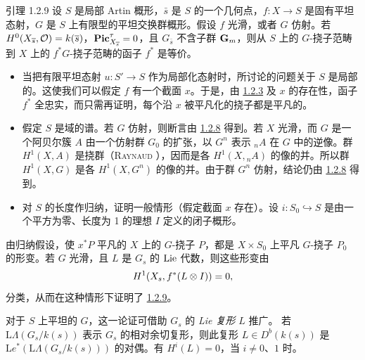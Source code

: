 \begin{enonce*}{引理 1.2.9}
设 $S$ 是局部 Artin 概形，$\bar{s}$ 是 $S$ 的一个几何点，$f:X\rightarrow S$ 是固有平坦态射，$G$ 是 $S$ 上有限型的平坦交换群概形。假设 $f$ 光滑，或者 $G$ 仿射。若 $H^0(X_{\overline{s}},{\mathcal O})=k(\overline{s})$，$\operatorname{\mathbf{Pic}}^{\tau}_{X_{\overline{s}}}=0$，且 $G_{\bar{s}}$ 不含子群 $\mathbf{G}_{m}$，则从 $S$ 上的 $G$-挠子范畴到 $X$ 上的 $f^{\ast}G$-挠子范畴的函子 $f^{\ast}$ 是等价。
\end{enonce*}

\begin{itemize}
\item[a.] 当把有限平坦态射 $u:S'\rightarrow S$ 作为局部化态射时，所讨论的问题关于 $S$ 是局部的。这使我们可以假定 $f$ 有一个截面 $x$。于是，由 \hyperref[XVIII.lem1.2.3]{1.2.3} 及 $x$ 的存在性，函子 $f^{\ast}$ 全忠实，而只需再证明，每个沿 $x$ 被平凡化的挠子都是平凡的。

\item[b.] 假定 $S$ 是域的谱。若 $G$ 仿射，则断言由 \hyperref[XVIII.lem1.2.8]{1.2.8} 得到。若 $X$ 光滑，而 $G$ 是一个阿贝尔簇 $A$ 由一个仿射群 $G_{0}$ 的扩张，以 $G^{n}$ 表示 ${}_{n}A$ 在 $G$ 中的逆像。群 $H^{1}(X,A)$ 是挠群（\textsc{Raynaud} \cite[XIII 2.6]{sga4.exp.XVIII.bib.5}），因而是各 $H^{1}(X,{}_{n}A)$ 的像的并。所以群 $H^{1}(X,G)$ 是各 $H^{1}(X,G^{n})$ 的像的并。由于群 $G^{n}$ 仿射，结论仍由 \hyperref[XVIII.lem1.2.8]{1.2.8} 得到。

\item[c.] 对 $S$ 的长度作归纳，证明一般情形（假定截面 $x$ 存在）。设 $i:S_{0}\hookrightarrow S$ 是由一个平方为零、长度为 1 的理想 $I$ 定义的闭子概形。
\end{itemize}

由归纳假设，使 $x^{\ast}P$ 平凡的 $X$ 上的 $G$-挠子 $P$，都是 $X\times S_{0}$ 上平凡 $G$-挠子 $P_{0}$ 的形变。若 $G$ 光滑，且 $L$ 是 $G_{s}$ 的 $\operatorname{Lie}$ 代数，则这些形变由
$$
H^{1}(X_{s},f^{\ast}(L\otimes I))=0{},
$$
分类，从而\pageoriginale{}在这种情形下证明了 \hyperref[XVIII.lem1.2.9]{1.2.9}。

对于 $S$ 上平坦的 $G$，这一论证可借助 $G_{s}$ 的 \emph{Lie 复形} $L$ 推广。
若 $\mathrm{L}\Lambda(G_{s}/k(s))$ 表示 $G_{s}$ 的相对余切复形，则此复形 $L\in D^{b}(k(s))$ 是 $\mathrm{L}e^{\ast}(\mathrm{L}\Lambda(G_{s}/k(s)))$ 的对偶。有 $H^{i}(L)=0$，当 $i\neq 0$、$1$ 时。

